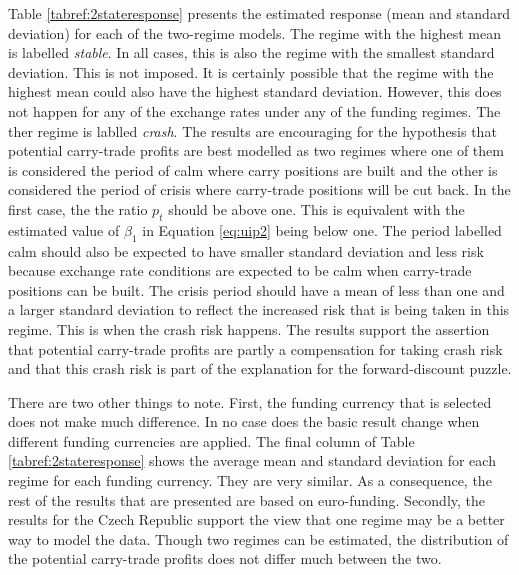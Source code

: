 \documentclass[12pt, a4paper, oneside]{article}\usepackage[]{graphicx}\usepackage[]{color}
\begin{document}
Table \ref{tabref:2stateresponse} presents the estimated response (mean and standard deviation) for each of the two-regime models. The regime with the highest mean is labelled \emph{stable}.  In all cases, this is also the regime with the smallest standard deviation.  This is not imposed.  It is certainly possible that the regime with the highest mean could also have the highest standard deviation.  However, this does not happen for any of the exchange rates under any of the funding regimes.  The  ther regime is lablled \emph{crash}.  The results are encouraging for the hypothesis that potential carry-trade profits are best modelled as two regimes where one of them is considered the period of calm where carry positions are built and the other is considered the period of crisis where carry-trade positions will be cut back.  In the first case, the the ratio $p_t$ should be above one.  This is equivalent with the estimated value of $\beta_1$ in Equation \ref{eq:uip2} being below one.  The period labelled calm should also be expected to have smaller standard deviation and less risk because exchange rate conditions are expected to be calm when carry-trade positions can be built.  The crisis period should have a mean of less than one and a larger standard deviation to reflect the increased risk that is being taken in this regime. This is when the crash risk happens. The results support the assertion that potential carry-trade profits are partly a compensation for taking crash risk and that this crash risk is part of the explanation for the forward-discount puzzle.    

There are two other things to note.  First, the funding currency that is selected does not make much difference.   In no case does the basic result change when different funding currencies are applied. The final column of Table \ref{tabref:2stateresponse} shows the average mean and standard deviation for each regime for each funding currency.  They are very similar. As a consequence, the rest of the results that are presented are based on euro-funding.  Secondly, the results for the Czech Republic support the view that one regime may be a better way to model the data. Though two regimes can be estimated, the distribution of the potential carry-trade profits does not differ much between the two. 
\end{document}
